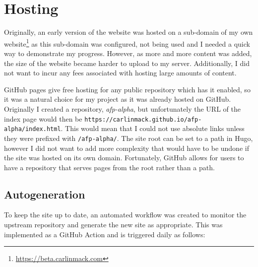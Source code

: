 \documentclass[bsc,frontabs,oneside,singlespacing,parskip,deptreport,logo]{infthesis}
\begin{document}
\section{Hosting}

Originally, an early version of the website was hosted on a sub-domain of my own website\footnote{\url{https://beta.carlinmack.com}} as this sub-domain was configured, not being used and I needed a quick way to demonstrate my progress. However, as more and more content was added, the size of the website became harder to upload to my server. Additionally, I did not want to incur any fees associated with hosting large amounts of content. 

GitHub pages give free hosting for any public repository which has it enabled, so it was a natural choice for my project as it was already hosted on GitHub. Originally I created a repository, \textit{afp-alpha}, but unfortunately the URL of the index page would then be \verb|https://carlinmack.github.io/afp-alpha/index.html|. This would mean that I could not use absolute links unless they were prefixed with \verb|/afp-alpha/|. The site root can be set to a path in Hugo, however I did not want to add more complexity that would have to be undone if the site was hosted on its own domain. Fortunately, GitHub allows for users to have a repository that serves pages from the root rather than a path.

\subsection{Autogeneration}

To keep the site up to date, an automated workflow was created to monitor the upstream repository and generate the new site as appropriate. This was implemented as a GitHub Action and is triggered daily as follows:
\end{document}
